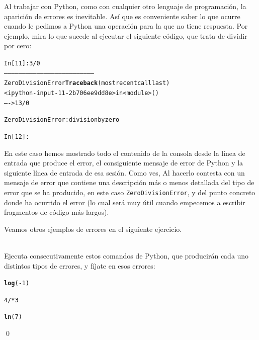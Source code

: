 \documentclass[10pt,a4paper]{article}\usepackage[]{graphicx}\usepackage[]{color}
\makeatletter
\newcommand{\hlnum}[1]{\textcolor[rgb]{0.686,0.059,0.569}{#1}}%
\newcommand{\hlopt}[1]{\textcolor[rgb]{0,0,0}{#1}}%
\newcommand{\hlstd}[1]{\textcolor[rgb]{0.345,0.345,0.345}{#1}}%
\newcommand{\hlkwd}[1]{\textcolor[rgb]{0.737,0.353,0.396}{\textbf{#1}}}%
\newenvironment{kframe}{%
 \def\at@end@of@kframe{}%
 \ifinner\ifhmode%
  \def\at@end@of@kframe{\end{minipage}}%
  \begin{minipage}{\columnwidth}%
 \fi\fi%
 \def\FrameCommand##1{\hskip\@totalleftmargin \hskip-\fboxsep
 \colorbox{shadecolor}{##1}\hskip-\fboxsep
     \hskip-\linewidth \hskip-\@totalleftmargin \hskip\columnwidth}%
 \MakeFramed {\advance\hsize-\width
   \@totalleftmargin\z@ \linewidth\hsize
   \@setminipage}}%
 {\par\unskip\endMakeFramed%
 \at@end@of@kframe}
\newenvironment{knitrout}{}{} %
\newcounter {cont01}
\makeatother
\begin{document}
Al trabajar con Python, como con cualquier otro lenguaje de programación, la aparición de errores es inevitable. Así que es conveniente saber lo que ocurre cuando le pedimos a Python una operación para la que no tiene respuesta. Por ejemplo, mira lo que sucede al ejecutar el siguiente código, que trata de dividir por cero:
\begin{knitrout}
\color{fgcolor}\begin{kframe}
\begin{alltt}
In [11]: 3 / 0
---------------------------------------------------------------------------
ZeroDivisionError                         \hlkwd{Traceback} (most recent call last)
<ipython-input-11-2b706ee9dd8e> in <module>()
----> 1 3 / 0

ZeroDivisionError: division by zero

In [12]:
\end{alltt}
\end{kframe}
\end{knitrout}
En este caso hemos mostrado todo el contenido de la consola desde la línea de entrada que produce el error, el consiguiente mensaje de error de Python y la siguiente línea de entrada de esa sesión. Como ves, Al hacerlo contesta con un mensaje de error que contiene una descripción más o menos detallada del tipo de error que se ha producido, en este caso {\tt ZeroDivisionError}, y del punto concreto donde ha ocurrido el error (lo cual será muy útil cuando empecemos a escribir fragmentos de código más largos).

Veamos otros ejemplos de errores en el siguiente ejercicio.
\begin{ejercicio}
\label{tut02:ejercicio03}
\quad\\
Ejecuta consecutivamente estos comandos de Python, que producirán cada uno distintos tipos de errores, y fíjate en esos errores:
\begin{knitrout}
\color{fgcolor}\begin{kframe}
\begin{alltt}
\hlkwd{log}\hlstd{(}\hlopt{-}\hlnum{1}\hlstd{)}
\end{alltt}
\end{kframe}
\end{knitrout}
\begin{knitrout}
\color{fgcolor}\begin{kframe}
\begin{alltt}
4/*3
\end{alltt}
\end{kframe}
\end{knitrout}
\begin{knitrout}
\color{fgcolor}\begin{kframe}
\begin{alltt}
\hlkwd{ln}\hlstd{(}\hlnum{7}\hlstd{)}
\end{alltt}
\end{kframe}
\end{knitrout}
\qed
\end{ejercicio}
\end{document}
